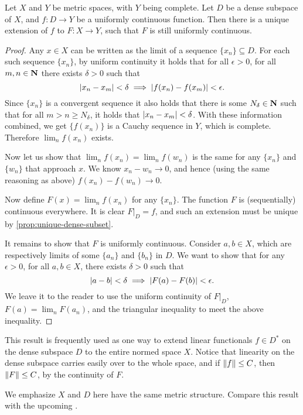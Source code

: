 \begin{thm} \label{thm:ext-unif-cont-func}
    Let $X$ and $Y$ be metric spaces, with $Y$ being complete. Let $D$ be a dense subspace of $X$, and $f\colon D \to Y$ be a uniformly continuous function. Then there is a unique extension of $f$ to $F\colon X \to Y$, such that $F$ is still uniformly continuous.
\end{thm}
\begin{proof}
    Any $x \in X$ can be written as the limit of a sequence $\{x_n\}\subseteq D$. For each such sequence $\{x_n\}$, by uniform continuity it holds that for all $\epsilon > 0$, for all $m,n\in \mathbf{N}$ there exists $\delta > 0$ such that \[
        \lvert x_n - x_m \rvert < \delta \implies \lvert f(x_n) - f(x_m) \rvert < \epsilon.
    \] Since $\{x_n\}$ is a convergent sequence it also holds that there is some $N_\delta \in \mathbf{N}$ such that for all $m > n\geq N_\delta$, it holds that $\lvert x_n - x_m \rvert < \delta$. With these information combined, we get $\{f(x_n)\}$ is a Cauchy sequence in $Y$, which is complete. Therefore $\lim_n f(x_n)$ exists.

    Now let us show that $\lim_n f(x_n) = \lim_n f(w_n)$ is the same for any $\{x_n\}$ and $\{w_n\}$ that approach $x$. We know $x_n - w_n \to 0$, and hence (using the same reasoning as above) $f(x_n) - f(w_n) \to 0$.

    Now define $F(x) = \lim_n f(x_n)$ for any $\{x_n\}$. The function $F$ is (sequentially) continuous everywhere. It is clear $F|_D = f$, and such an extension must be unique by \cref{prop:unique-dense-subset}.

    It remains to show that $F$ is uniformly continuous. Consider $a,b\in X$, which are respectively limits of some $\{a_n\}$ and $\{b_n\}$ in $D$. We want to show that for any $\epsilon > 0$, for all $a,b\in X$, there exists $\delta > 0$ such that \[
        \lvert a - b \rvert < \delta \implies \lvert F(a) - F(b) \rvert < \epsilon.
    \] We leave it to the reader to use the uniform continuity of $F|_D$, $F(a) = \lim_n F(a_n)$, and the triangular inequality to meet the above inequality.
\end{proof}

This result is frequently used as one way to extend linear functionals $f \in D^*$ on the dense subspace $D$ to the entire normed space $X$. Notice that linearity on the dense subspace carries easily over to the whole space, and if $\lVert f \rVert \leq C$, then $\lVert F \rVert \leq C$, by the continuity of $F$.

We emphasize $X$ and $D$ here have the same metric structure. Compare this result with the upcoming .

